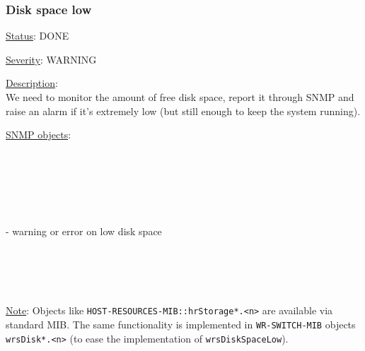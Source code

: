 \subsubsection{\bf Disk space low}
		\label{fail:other:no_disk}
		\begin{pck_descr}
			\item [] \underline{Status}: DONE
			\item [] \underline{Severity}: WARNING
			\item [] \underline{Description}:\\
				We need to monitor the amount of free disk space, report it through SNMP
				and raise an alarm if it's extremely low (but still enough to keep the
				system running).
			\item [] \underline{SNMP objects}:\\
				\\
				\\
				\\
				\\
				\\
				\\
				 - warning or error on low disk space\\
				\\
				\\
				\\
				\\
			\item [] \underline{Note}:
				Objects like \texttt{HOST-RESOURCES-MIB::hrStorage*.<n>} are available
				via standard MIB. The same functionality is implemented in
				\texttt{WR-SWITCH-MIB} objects \texttt{wrsDisk*.<n>} (to ease the
				implementation of \texttt{wrsDiskSpaceLow}).
		\end{pck_descr}

